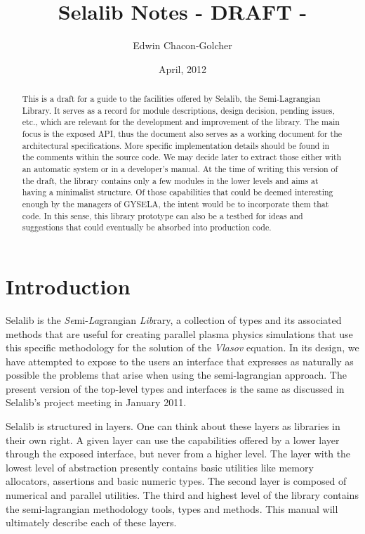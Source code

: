 \documentclass[]{report}   %
\begin{document}
\title{Selalib Notes - DRAFT -}   
\author{Edwin Chacon-Golcher}        
\date{April, 2012}    
\maketitle

\begin{abstract}
 This is a draft for a guide to the facilities offered by Selalib, the Semi-Lagrangian Library. It serves as a record for module descriptions, design decision, pending issues, etc., which are relevant for the development and improvement of the library. The main focus is the exposed API, thus the document also serves as a working document for the architectural specifications. More specific implementation details should be found in the comments within the source code. We may decide later to extract those either with an automatic system or in a developer's manual. At the time of writing this version of the draft, the library contains only a few modules in the lower levels and aims at having a minimalist structure. Of those capabilities that could be deemed interesting enough by the managers of GYSELA, the intent would be to incorporate them that code. In this sense, this library prototype can also be a testbed for ideas and suggestions that could eventually be absorbed into production code.
\end{abstract}

\tableofcontents

\chapter{Introduction}             %
Selalib is the \emph{Se}mi-\emph{La}grangian \emph{Lib}rary, a collection of types and its associated methods that are useful for creating parallel plasma physics simulations that use this specific methodology for the solution of the \emph{Vlasov} equation. In its design, we have attempted to expose to the users an interface that expresses as naturally as possible the problems that arise when using the semi-lagrangian approach. The present version of the top-level types and interfaces is the same as discussed in Selalib's project meeting in January 2011. 

Selalib is structured in layers. One can think about these layers as libraries in their own right. A given layer can use the capabilities offered by a lower layer through the exposed interface, but never from a higher level. The layer with the lowest level of abstraction presently contains basic utilities like memory allocators, assertions and basic numeric types. The second layer is composed of numerical and parallel utilities. The third and highest level of the library contains the semi-lagrangian methodology tools, types and methods. This manual will ultimately describe each of these layers.
\end{document}
